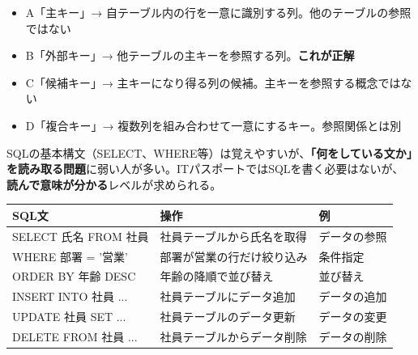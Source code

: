 \begin{goutoubun}
\begin{itemize}
  \item A「主キー」→ 自テーブル内の行を一意に識別する列。他のテーブルの参照ではない
  \item B「外部キー」→ 他テーブルの主キーを参照する列。\textbf{これが正解}
  \item C「候補キー」→ 主キーになり得る列の候補。主キーを参照する概念ではない
  \item D「複合キー」→ 複数列を組み合わせて一意にするキー。参照関係とは別
\end{itemize}
\end{goutoubun}





\mondaipage
{}

\begin{stumble}
SQLの基本構文（SELECT、WHERE等）は覚えやすいが、\textbf{「何をしている文か」を読み取る問題}に弱い人が多い。ITパスポートではSQLを書く必要はないが、\textbf{読んで意味が分かる}レベルが求められる。
\end{stumble}

\begin{comparison}
\begin{tabularx}{\textwidth}{lXX}
  \toprule
  \textbf{SQL文} & \textbf{操作} & \textbf{例} \\
  \midrule
  SELECT 氏名 FROM 社員 & 社員テーブルから氏名を取得 & データの参照 \\
  WHERE 部署 = '営業' & 部署が営業の行だけ絞り込み & 条件指定 \\
  ORDER BY 年齢 DESC & 年齢の降順で並び替え & 並び替え \\
  INSERT INTO 社員 ... & 社員テーブルにデータ追加 & データの追加 \\
  UPDATE 社員 SET ... & 社員テーブルのデータ更新 & データの変更 \\
  DELETE FROM 社員 ... & 社員テーブルからデータ削除 & データの削除 \\
  \bottomrule
\end{tabularx}
\end{comparison}


